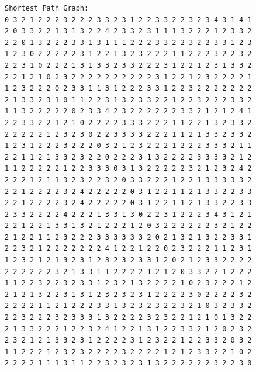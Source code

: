 \documentclass[11pt]{article}
\begin{document}
\begin{lstlisting}
Shortest Path Graph:
0 3 2 1 2 2 2 3 2 2 2 3 3 2 3 1 2 2 3 3 2 2 3 2 3 4 3 1 4 1
2 0 3 3 2 2 1 3 1 3 2 2 4 2 3 3 2 3 1 1 1 3 2 2 2 1 2 3 3 2
2 2 0 1 3 2 2 2 3 3 1 3 1 1 1 2 2 2 3 3 2 2 3 2 2 3 3 1 2 3
1 2 3 0 2 2 2 2 2 3 1 2 2 1 3 2 3 2 2 2 1 1 2 2 2 3 2 2 3 2
2 2 3 1 0 2 2 2 1 3 1 3 3 2 3 3 2 2 2 3 1 2 2 1 2 3 1 3 3 2
2 2 1 2 1 0 2 3 2 2 2 2 2 2 2 2 2 2 3 1 2 2 1 2 3 2 2 2 2 1
1 2 3 2 2 2 0 2 3 3 1 1 3 1 2 2 2 3 3 1 2 2 3 2 2 2 2 2 2 2
2 1 3 3 2 3 1 0 1 1 2 2 3 1 3 2 3 3 2 2 1 2 2 3 2 2 2 3 3 2
1 1 3 2 2 2 2 2 0 2 3 3 4 2 3 2 2 2 2 2 2 3 3 2 1 2 1 2 4 1
2 2 3 3 2 2 1 2 1 0 2 2 2 2 3 3 3 2 2 2 1 1 2 2 1 3 2 3 3 2
2 2 2 2 2 1 2 3 2 3 0 2 2 3 3 3 3 2 2 2 1 1 2 1 3 3 2 3 3 2
1 2 3 1 2 2 2 3 2 2 2 0 3 2 1 2 3 2 2 2 1 2 2 2 3 3 3 2 1 1
2 2 1 1 2 1 3 3 2 3 2 2 0 2 2 2 3 1 3 2 2 2 2 3 3 3 3 2 1 2
1 1 2 2 2 2 2 1 2 2 3 3 3 0 3 1 3 2 2 2 2 2 3 2 1 2 3 2 4 2
2 2 2 1 2 1 1 3 2 3 2 2 3 2 0 3 3 2 2 2 1 2 2 1 3 3 3 3 3 2
2 2 1 2 2 2 2 3 2 4 2 2 2 2 2 0 3 1 2 2 1 1 2 1 3 3 2 2 3 3
2 2 1 2 2 2 2 3 2 4 2 2 2 2 2 0 3 1 2 2 1 1 2 1 3 3 2 2 3 3
2 3 3 2 2 2 2 4 2 2 2 1 3 3 1 3 0 2 2 3 1 2 2 2 3 4 3 1 2 1
2 2 1 2 2 1 3 3 1 3 2 1 2 2 2 1 2 0 3 2 2 2 2 2 2 3 2 1 2 2
2 1 2 2 1 1 2 3 2 2 2 3 3 3 3 3 3 2 0 2 1 3 2 1 3 2 2 3 3 1
2 2 3 2 1 2 2 2 2 2 2 2 4 1 2 2 1 2 2 0 2 3 2 2 2 1 1 2 3 1
1 2 3 2 1 2 1 3 2 3 1 2 3 2 3 2 3 3 1 2 0 2 1 2 3 3 2 2 2 2
2 2 2 2 2 2 3 2 1 3 3 1 1 2 2 2 2 1 2 1 2 0 3 3 2 2 1 2 2 2
1 1 2 2 3 2 2 3 2 3 3 1 2 3 2 1 3 2 2 2 2 1 0 2 3 2 2 2 1 2
2 1 2 1 3 2 2 3 1 3 1 2 3 2 3 2 3 1 2 2 2 2 3 0 2 2 2 2 3 2
2 2 2 2 1 1 2 1 2 2 2 3 3 1 3 2 3 2 3 2 2 3 2 1 0 3 2 3 3 2
2 2 3 2 2 2 3 2 3 3 3 1 3 2 2 2 2 3 2 3 2 2 1 2 1 0 1 3 2 2
2 1 3 3 2 2 2 1 2 2 3 2 4 1 2 2 1 3 1 2 2 3 3 2 1 2 0 2 3 2
2 3 2 1 2 1 3 3 2 3 1 2 2 2 2 3 1 2 3 2 2 1 2 2 3 3 2 0 3 2
1 1 2 2 2 1 2 3 2 3 2 2 2 2 3 2 2 2 2 1 2 1 2 3 3 2 2 1 0 2
2 2 2 2 1 1 1 3 1 1 2 2 3 2 3 2 3 1 3 2 2 2 2 2 2 3 2 2 3 0


\end{lstlisting}
\end{document}
